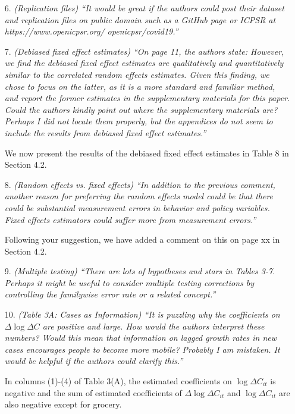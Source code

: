 \documentclass[11pt]{article}
\begin{document}
\begin{itemize}
\item[6.]  \textit{(Replication files) ``It would be great if the authors could post their dataset and replication
files on public domain such as a GitHub page or ICPSR at https://www.openicpsr.org/
openicpsr/covid19.''}
  
\item[7.]  \textit{(Debiased fixed effect estimates) ``On page 11, the authors state:
However, we find the debiased fixed effect estimates are qualitatively and quantitatively
similar to the correlated random effects estimates. Given this finding,
we chose to focus on the latter, as it is a more standard and familiar method, and
report the former estimates in the supplementary materials for this paper.
Could the authors kindly point out where the supplementary materials are? Perhaps I did not
locate them properly, but the appendices do not seem to include the results from debiased
fixed effect estimates.''}

We now present the results of the debiased fixed effect estimates in Table 8 in Section 4.2. 
  
\item[8.]  \textit{(Random effects vs. fixed effects) ``In addition to the previous comment, another reason for
preferring the random effects model could be that there could be substantial measurement
errors in behavior and policy variables. Fixed effects estimators could suffer more from measurement
errors.''}

Following your suggestion, we have added a comment on this on page xx in Section 4.2.
  
\item[9.]  \textit{(Multiple testing) ``There are lots of hypotheses and stars in Tables 3-7. Perhaps it might be
useful to consider multiple testing corrections by controlling the familywise error rate or a
related concept.''}
  
\item[10.]  \textit{(Table 3A: Cases as Information) ``It is puzzling why the coefficients on  $\Delta\log\Delta C$ are positive
and large. How would the authors interpret these numbers? Would this mean that information
on lagged growth rates in new cases encourages people to become more mobile?
Probably I am mistaken. It would be helpful if the authors could clarify this.''}

In columns (1)-(4) of Table 3(A), the estimated coefficients on $\log\Delta C_{it}$ is negative and the sum of estimated coefficients of $\Delta \log\Delta C_{it} $ and $\log\Delta C_{it}$ are also negative except for grocery.


\end{itemize}
\end{document}
